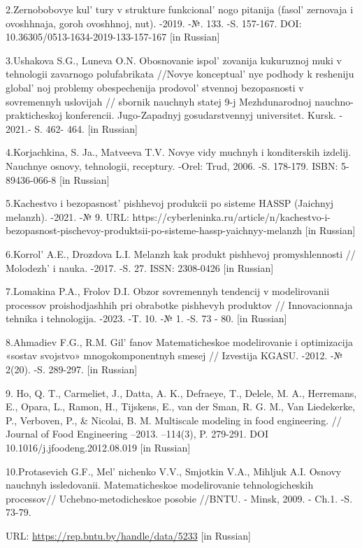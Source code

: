 2.Zernobobovye kul' tury v strukture
funkcional' nogo pitanija (fasol'{}
zernovaja i ovoshhnaja, goroh ovoshhnoj, nut). -2019. -№. 133. -S.
157-167. DOI: 10.36305/0513-1634-2019-133-157-167 {[}in Russian{]}

3.Ushakova S.G., Luneva O.N. Obosnovanie ispol' zovanija
kukuruznoj muki v tehnologii zavarnogo polufabrikata //Novye
konceptual' nye podhody k resheniju
global' noj problemy obespechenija
prodovol' stvennoj bezopasnosti v sovremennyh uslovijah
// sbornik nauchnyh statej 9-j Mezhdunarodnoj nauchno-prakticheskoj
konferencii. Jugo-Zapadnyj gosudarstvennyj universitet. Kursk. - 2021.-
S. 462- 464. {[}in Russian{]}

4.Korjachkina, S. Ja., Matveeva T.V. Novye vidy muchnyh i konditerskih
izdelij. Nauchnye osnovy, tehnologii, receptury. -Orel: Trud, 2006. -S.
178-179. ISBN: 5-89436-066-8 {[}in Russian{]}

5.Kachestvo i bezopasnost'{} pishhevoj produkcii po
sisteme HASSP (Jaichnyj melanzh). -2021. -№ 9. URL:
https://cyberleninka.ru/article/n/kachestvo-i-bezopasnost-pischevoy-produktsii-po-sisteme-hassp-yaichnyy-melanzh
{[}in Russian{]}

6.Korrol'{} A.E., Drozdova L.I. Melanzh kak produkt
pishhevoj promyshlennosti // Molodezh'{} i nauka. -2017.
-S. 27. ISSN: 2308-0426 {[}in Russian{]}

7.Lomakina P.A., Frolov D.I. Obzor sovremennyh tendencij v modelirovanii
processov proishodjashhih pri obrabotke pishhevyh produktov //
Innovacionnaja tehnika i tehnologija. -2023. -T. 10. -№ 1. -S. 73 - 80.
{[}in Russian{]}

8.Ahmadiev F.G., R.M. Gil' fanov Matematicheskoe
modelirovanie i optimizacija «sostav svojstvo» mnogokomponentnyh smesej
// Izvestija KGASU. -2012. -№ 2(20). -S. 289-297. {[}in Russian{]}

9. Ho, Q. T., Carmeliet, J., Datta, A. K., Defraeye, T., Delele, M. A.,
Herremans, E., Opara, L., Ramon, H., Tijskens, E., van der Sman, R. G.
M., Van Liedekerke, P., Verboven, P., \& Nicolai, B. M. Multiscale
modeling in food engineering. // Journal of Food Engineering --2013.
--114(3), P. 279-291. DOI 10.1016/j.jfoodeng.2012.08.019 {[}in
Russian{]}

10.Protasevich G.F., Mel' nichenko V.V., Smjotkin V.A.,
Mihljuk A.I. Osnovy nauchnyh issledovanii. Matematicheskoe modelirovanie
tehnologicheskih processov// Uchebno-metodicheskoe posobie //BNTU. -
Minsk, 2009. - Ch.1. -S. 73-79.

URL: \url{https://rep.bntu.by/handle/data/5233} {[}in Russian{]}

